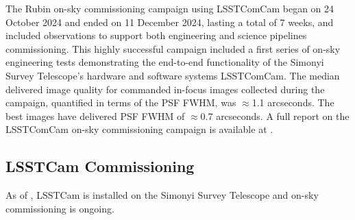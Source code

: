 The Rubin on-sky commissioning campaign using  LSSTComCam began on 24 October 2024 and ended on 11 December 2024, lasting a total of 7 weeks, and included observations to support both engineering and science pipelines commissioning.
This highly successful campaign included a first series of on-sky engineering tests demonstrating the end-to-end functionality of the Simonyi Survey Telescope’s hardware and software systems  LSSTComCam.
The median delivered image quality  for commanded in-focus images collected during the campaign, quantified in terms of the PSF FWHM, was $\approx$1.1 arcseconds. 
The best images have delivered PSF FWHM of $\approx$0.7 arcseconds.
A full report on the  LSSTComCam on-sky commissioning campaign is available at .


\subsection{LSSTCam Commissioning}
\label{ssec:commissioning-lsstcam}

As of \currentdate, LSSTCam is installed on  the Simonyi Survey Telescope and on-sky commissioning is ongoing. 

